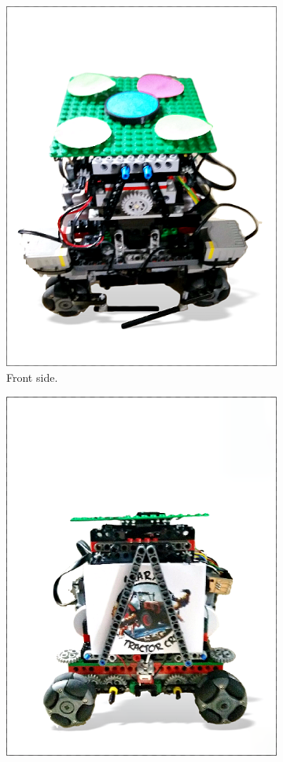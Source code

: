 \begin{figure}[!tbp]
  \begin{subfigure}[b]{0.4\textwidth}
    \includegraphics[width=0.9\linewidth]{res/robot.png}
    \caption{Front side.}
    \label{fig:f1}
  \end{subfigure}
  \hfill
  \begin{subfigure}[b]{0.4\textwidth}
    \includegraphics[width=0.9\linewidth]{res/robotback.png}

\end{subfigure}
\end{figure}

